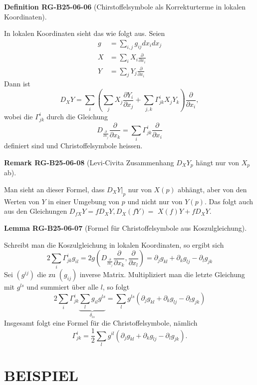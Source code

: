 \documentclass[10pt, letterpaper]{article}
\newcommand{\CustomHeading}[3]{%
  \par\medskip\noindent%
  \textbf{#1 #2} \textnormal{(#3)}.\enskip%
}
\newenvironment{DEF}[2]{\begin{unitbox}\CustomHeading{Definition}{#1}{#2}}{\end{unitbox}}
\newenvironment{LEM}[2]{\begin{unitbox}\CustomHeading{Lemma}{#1}{#2}}{\end{unitbox}}
\newenvironment{REM}[2]{\begin{unitbox}\CustomHeading{Remark}{#1}{#2}}{\end{unitbox}}
\begin{document}
\begin{DEF}{RG-B25-06-06}{Chirstoffelsymbole als Korrekturterme in lokalen Koordinaten}
In lokalen Koordinaten sieht das wie folgt aus. Seien
$$
\begin{aligned}
g & =\sum_{i, j} g_{i j} d x_{i} d x_{j} \\
X & =\sum_{i} X_{i} \frac{\partial}{\partial x_{i}} \\
Y & =\sum_{j} Y_{j} \frac{\partial}{\partial x_{i}}
\end{aligned}
$$
Dann ist
$$
D_{X} Y=\sum_{i}\left(\sum_{j} X_{j} \frac{\partial Y_{i}}{\partial x_{j}}+\sum_{j, k} \Gamma_{j k}^{i} X_{j} Y_{k}\right) \frac{\partial}{\partial x_{i}},
$$
wobei die $\Gamma_{j k}^{i}$ durch die Gleichung
$$
D_{\frac{\partial}{\partial x_{j}}} \frac{\partial}{\partial x_{k}}=\sum_{i} \Gamma_{j k}^{i} \frac{\partial}{\partial x_{i}}
$$
definiert sind und Christoffelsymbole heissen.
\end{DEF}


\begin{REM}{RG-B25-06-08}{Levi-Civita Zusammenhang $D_XY_p$ hängt nur von $X_p$ ab}
Man sieht an dieser Formel, dass $\left.D_{X} Y\right|_{p}$ nur von $X(p)$ abhängt, aber von den Werten von $Y$ in einer Umgebung von $p$ und nicht nur von $Y(p)$. Das folgt auch aus den Gleichungen $D_{f X} Y=f D_{X} Y, D_{X}(f Y)=$ $X(f) Y+f D_{X} Y$.
\end{REM}



\begin{LEM}{RG-B25-06-07}{Formel für Christoffelsymbole aus Koszulgleichung}
Schreibt man die Koszulgleichung in lokalen Koordinaten, so ergibt sich
$$
2 \sum_{i} \Gamma_{j k}^{i} g_{i l}=2 g\left(D_{\frac{\partial}{\partial x_{j}}} \frac{\partial}{\partial x_{k}}, \frac{\partial}{\partial x_{l}}\right)=\partial_{j} g_{k l}+\partial_{k} g_{l j}-\partial_{l} g_{j k}
$$
Sei $\left(g^{i j}\right)$ die zu $\left(g_{i j}\right)$ inverse Matrix. Multipliziert man die letzte Gleichung mit $g^{l s}$ und summiert über alle $l$, so folgt
$$
2 \sum_{i} \Gamma_{j k}^{i} \underbrace{\sum_{l} g_{i l} g^{l s}}_{\delta_{i s}}=\sum_{l} g^{l s}\left(\partial_{j} g_{k l}+\partial_{k} g_{l j}-\partial_{l} g_{j k}\right)
$$
Insgesamt folgt eine Formel für die Christoffelsymbole, nämlich
$$
\Gamma_{j k}^{i}=\frac{1}{2} \sum_{l} g^{i l}\left(\partial_{j} g_{k l}+\partial_{k} g_{l j}-\partial_{l} g_{j k}\right) .
$$
\end{LEM}


\section*{BEISPIEL}
\end{document}

